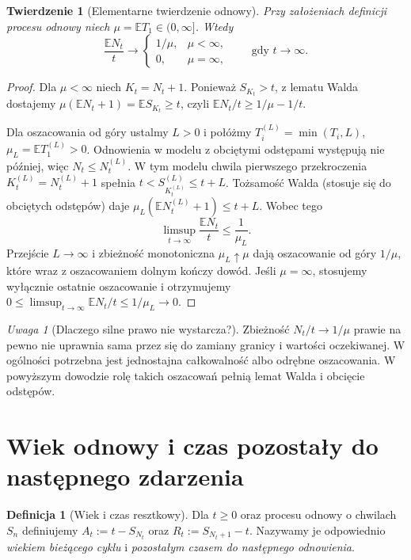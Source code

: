 \documentclass[11pt,a4paper,oneside]{report}
\numberwithin{equation}{chapter}
\theoremstyle{plain}
\newtheorem{twierdzenie}{Twierdzenie}[chapter]
\theoremstyle{definition}
\newtheorem{definicja}{Definicja}[chapter]
\theoremstyle{remark}
\newtheorem{uwaga}{Uwaga}[chapter]
\newcommand{\E}{\mathbb{E}}
\begin{document}
\begin{twierdzenie}[Elementarne twierdzenie odnowy]
Przy założeniach definicji procesu odnowy niech
$\mu=\E T_1\in(0,\infty]$. Wtedy
\[
\frac{\E N_t}{t}\longrightarrow
\begin{cases}1/\mu,&\mu<\infty,\\0,&\mu=\infty,\end{cases}
\qquad\text{gdy }t\to\infty.
\]
\end{twierdzenie}
\begin{proof}
Dla $\mu<\infty$ niech $K_t=N_t+1$.
Ponieważ $S_{K_t}>t$, z lematu Walda dostajemy
$\mu(\E N_t+1)=\E S_{K_t}\ge t$,
czyli $\E N_t/t\ge1/\mu-1/t$.

Dla oszacowania od góry ustalmy $L>0$ i połóżmy
$T_i^{(L)}=\min(T_i,L)$, $\mu_L=\E T_1^{(L)}>0$.
Odnowienia w modelu z obciętymi odstępami występują
nie później, więc $N_t\le N_t^{(L)}$.
W tym modelu chwila pierwszego przekroczenia
$K_t^{(L)}=N_t^{(L)}+1$ spełnia
$t<S_{K_t^{(L)}}^{(L)}\le t+L$.
Tożsamość Walda (stosuje się do obciętych odstępów) daje
$\mu_L(\E N_t^{(L)}+1)\le t+L$. Wobec tego
\[
\limsup_{t\to\infty}\frac{\E N_t}{t}\le\frac{1}{\mu_L}.
\]
Przejście $L\to\infty$ i zbieżność monotoniczna
$\mu_L\uparrow\mu$ dają oszacowanie od góry $1/\mu$,
które wraz z oszacowaniem dolnym kończy dowód.
Jeśli $\mu=\infty$, stosujemy wyłącznie ostatnie
oszacowanie i otrzymujemy
$0\le\limsup_{t\to\infty}\E N_t/t\le1/\mu_L\to0$.
\end{proof}

\begin{uwaga}[Dlaczego silne prawo nie wystarcza?]
Zbieżność $N_t/t\to1/\mu$ prawie na pewno nie uprawnia
sama przez się do zamiany granicy i wartości oczekiwanej.
W ogólności potrzebna jest jednostajna całkowalność
albo odrębne oszacowania. W powyższym dowodzie rolę takich
oszacowań pełnią lemat Walda i obcięcie odstępów.
\end{uwaga}

\section{Wiek odnowy i czas pozostały do następnego zdarzenia}
\begin{definicja}[Wiek i czas resztkowy]
Dla $t\ge0$ oraz procesu odnowy o chwilach $S_n$ definiujemy
$A_t:=t-S_{N_t}$ oraz $R_t:=S_{N_t+1}-t$.
Nazywamy je odpowiednio \emph{wiekiem bieżącego cyklu}
i \emph{pozostałym czasem do następnego odnowienia}.
\end{definicja}
\end{document}
